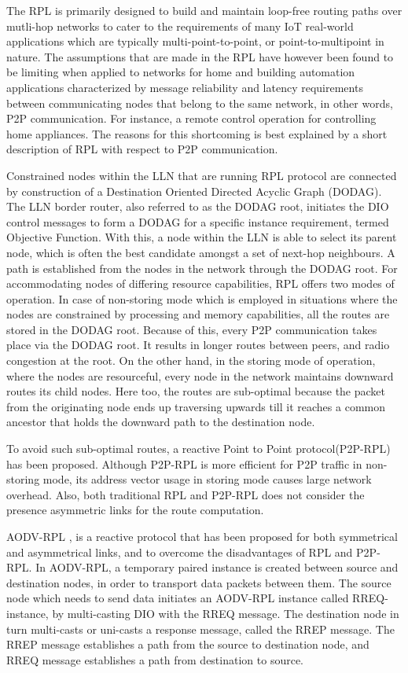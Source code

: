 \documentclass[conference, letterpaper]{IEEEtran}
\begin{document}
The RPL is primarily designed to build and maintain loop-free routing paths over
mutli-hop networks to cater to the requirements of many IoT real-world
applications which are typically multi-point-to-point, or point-to-multipoint in
nature. The assumptions that are made in the RPL have however been found to be
limiting when applied to networks for home and building automation applications
characterized by message reliability and latency requirements between
communicating nodes that belong to the same network, in other words, P2P
communication. For instance, a remote control operation for controlling home
appliances. The reasons for this shortcoming is best explained by a short
description of RPL with respect to P2P communication.

Constrained nodes within the LLN that are running RPL protocol are connected by
construction of a Destination Oriented Directed Acyclic Graph (DODAG). The LLN
border router, also referred to as the DODAG root, initiates the DIO control
messages to form a DODAG for a specific instance requirement, termed Objective
Function. With this, a node within the LLN is able to select its parent node,
which is often the best candidate amongst a set of next-hop neighbours. A path
is established from the nodes in the network through the DODAG root. For
accommodating nodes of differing resource capabilities, RPL offers two modes of
operation. In case of non-storing mode which is employed in situations where the
nodes are constrained by processing and memory capabilities, all the routes are
stored in the DODAG root. Because of this, every P2P communication takes place
via the DODAG root. It results in longer routes between peers, and radio
congestion at the root. On the other hand, in the storing mode of operation,
where the nodes are resourceful, every node in the network maintains downward
routes its child nodes. Here too, the routes are sub-optimal because the packet
from the originating node ends up traversing upwards till it reaches a common
ancestor that holds the downward path to the destination node.

To avoid such sub-optimal routes, a reactive Point to Point \cite{RFC6997}
protocol(P2P-RPL) has been proposed. Although P2P-RPL is more efficient for P2P
traffic in non-storing mode, its address vector usage in storing mode causes
large network overhead.  Also, both traditional RPL and P2P-RPL does not
consider the presence asymmetric links for the route computation.

AODV-RPL \cite{I-D.ietf-roll-aodv-rpl}, is a reactive protocol that has been
proposed for both symmetrical and asymmetrical links, and to overcome the
disadvantages of RPL and P2P-RPL. In AODV-RPL, a temporary paired instance is
created between source and destination nodes, in order to transport data
packets between them. The source node which needs to send data initiates an
AODV-RPL instance called RREQ-instance, by multi-casting DIO with the RREQ
message.  The destination node in turn multi-casts or uni-casts a response
message, called the RREP message. The RREP message establishes a path from the
source to destination node, and RREQ message establishes a path from
destination to source.
\end{document}
